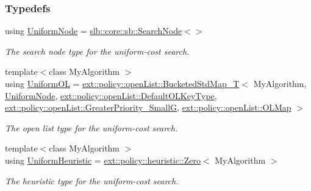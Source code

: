 \subsubsection*{Typedefs}
\begin{DoxyCompactItemize}
\item 
using \hyperlink{namespaceslb_1_1ext_1_1algorithm_a697c5839a166be7cc9cd7fc3c2b15f98}{Uniform\+Node} = \hyperlink{structslb_1_1core_1_1sb_1_1SearchNode}{slb\+::core\+::sb\+::\+Search\+Node}$<$$>$\hypertarget{namespaceslb_1_1ext_1_1algorithm_a697c5839a166be7cc9cd7fc3c2b15f98}{}\label{namespaceslb_1_1ext_1_1algorithm_a697c5839a166be7cc9cd7fc3c2b15f98}

\begin{DoxyCompactList}\small\item\em The search node type for the uniform-\/cost search. \end{DoxyCompactList}\item 
{\footnotesize template$<$class My\+Algorithm $>$ }\\using \hyperlink{namespaceslb_1_1ext_1_1algorithm_aebb91df5b56955857d898d76d9ca5873}{Uniform\+OL} = \hyperlink{structslb_1_1ext_1_1policy_1_1openList_1_1BucketedStdMap__T}{ext\+::policy\+::open\+List\+::\+Bucketed\+Std\+Map\+\_\+T}$<$ My\+Algorithm, \hyperlink{namespaceslb_1_1ext_1_1algorithm_a697c5839a166be7cc9cd7fc3c2b15f98}{Uniform\+Node}, \hyperlink{structslb_1_1ext_1_1policy_1_1openList_1_1DefaultOLKeyType}{ext\+::policy\+::open\+List\+::\+Default\+O\+L\+Key\+Type}, \hyperlink{structslb_1_1ext_1_1policy_1_1openList_1_1GreaterPriority__SmallG}{ext\+::policy\+::open\+List\+::\+Greater\+Priority\+\_\+\+SmallG}, \hyperlink{namespaceslb_1_1ext_1_1policy_1_1openList_ae328455bada2886ad728a9f54bfa1f6a}{ext\+::policy\+::open\+List\+::\+O\+L\+Map} $>$
\begin{DoxyCompactList}\small\item\em The open list type for the uniform-\/cost search. \end{DoxyCompactList}\item 
{\footnotesize template$<$class My\+Algorithm $>$ }\\using \hyperlink{namespaceslb_1_1ext_1_1algorithm_a4df6bd68a037486451c16445cb78d21f}{Uniform\+Heuristic} = \hyperlink{structslb_1_1ext_1_1policy_1_1heuristic_1_1Zero}{ext\+::policy\+::heuristic\+::\+Zero}$<$ My\+Algorithm $>$
\begin{DoxyCompactList}\small\item\em The heuristic type for the uniform-\/cost search. \end{DoxyCompactList}\item 

\end{DoxyCompactItemize}
